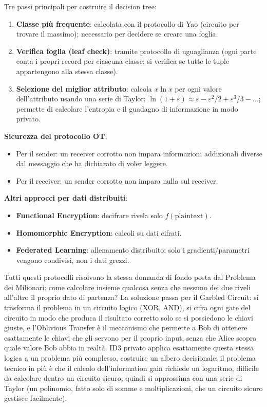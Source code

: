 \documentclass[a4paper,11pt]{article}
\begin{document}
Tre passi principali per costruire il decision tree:
\begin{enumerate}
  \item \textbf{Classe pi\`{u} frequente}: calcolata con il protocollo di Yao (circuito per trovare il massimo); necessario per decidere se creare una foglia.
  \item \textbf{Verifica foglia (leaf check)}: tramite protocollo di uguaglianza (ogni parte conta i propri record per ciascuna classe; si verifica se tutte le tuple appartengono alla stessa classe).
  \item \textbf{Selezione del miglior attributo}: calcola $x \ln x$ per ogni valore dell'attributo usando una serie di Taylor: $\ln(1+\varepsilon) \approx \varepsilon - \varepsilon^2/2 + \varepsilon^3/3 - \ldots$; permette di calcolare l'entropia e il guadagno di informazione in modo privato.
\end{enumerate}

\textbf{Sicurezza del protocollo OT}:
\begin{itemize}
  \item Per il sender: un receiver corrotto non impara informazioni addizionali diverse dal messaggio che ha dichiarato di voler leggere.
  \item Per il receiver: un sender corrotto non impara nulla sul receiver.
\end{itemize}

\textbf{Altri approcci per dati distribuiti}:
\begin{itemize}
  \item \textbf{Functional Encryption}: decifrare rivela solo $f(\text{plaintext})$.
  \item \textbf{Homomorphic Encryption}: calcoli su dati cifrati.
  \item \textbf{Federated Learning}: allenamento distribuito; solo i gradienti/parametri vengono condivisi, non i dati grezzi.
\end{itemize}

\begin{nota}
Tutti questi protocolli risolvono la stessa domanda di fondo posta dal Problema dei Milionari: come calcolare insieme qualcosa senza che nessuno dei due riveli all'altro il proprio dato di partenza? La soluzione passa per il Garbled Circuit: si trasforma il problema in un circuito logico (XOR, AND), si cifra ogni gate del circuito in modo che produca il risultato corretto solo se si possiedono le chiavi giuste, e l'Oblivious Transfer \`{e} il meccanismo che permette a Bob di ottenere esattamente le chiavi che gli servono per il proprio input, senza che Alice scopra quale valore Bob abbia in realt\`{a}. ID3 privato applica esattamente questa stessa logica a un problema pi\`{u} complesso, costruire un albero decisionale: il problema tecnico in pi\`{u} \`{e} che il calcolo dell'information gain richiede un logaritmo, difficile da calcolare dentro un circuito sicuro, quindi si approssima con una serie di Taylor (un polinomio, fatto solo di somme e moltiplicazioni, che un circuito sicuro gestisce facilmente).
\end{nota}
\end{document}
